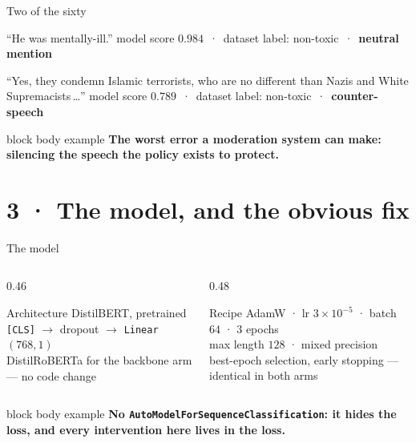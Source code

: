 \documentclass[aspectratio=169,11pt,xcolor={table}]{beamer}
\newcommand{\thespeaker}{}
\newcommand{\takeaway}[1]{%
  \vspace{0.6ex}%
  \begin{beamercolorbox}[wd=\textwidth,sep=1.0ex,rounded=true]{block body example}%
    \small\textbf{#1}%
  \end{beamercolorbox}}
\newcommand{\hint}[1]{{\footnotesize\color{fairgrey}#1}}
\begin{document}
\begin{frame}{Two of the sixty}
  \vspace{3.0ex}
  \begin{block}{\normalsize ``He was mentally-ill.''}
    \small model score $0.984$ \,·\, dataset label: non-toxic \,·\,
    \textbf{neutral mention}
  \end{block}

  \vspace{2.0ex}
  \begin{block}{\normalsize ``Yes, they condemn Islamic terrorists, who are no
    different than Nazis and White Supremacists\,\ldots''}
    \small model score $0.789$ \,·\, dataset label: non-toxic \,·\,
    \textbf{counter-speech}
  \end{block}

  \takeaway{The worst error a moderation system can make: silencing the speech
    the policy exists to protect.}
\end{frame}

\renewcommand{\thespeaker}{Samadov, Nijat}
\section{3 · The model, and the obvious fix}

\begin{frame}{The model}
  \vspace{2.4ex}
  \begin{columns}[t,onlytextwidth]
    \begin{column}{0.46\textwidth}
      \begin{block}{Architecture}
        \small DistilBERT, pretrained\\
        \texttt{[CLS]} $\rightarrow$ dropout $\rightarrow$
        \texttt{Linear}$(768,1)$\\[0.6ex]
        \hint{DistilRoBERTa for the backbone arm --- no code change}
      \end{block}
    \end{column}
    \begin{column}{0.48\textwidth}
      \begin{block}{Recipe}
        \small AdamW · lr $3\times10^{-5}$ · batch $64$ · $3$ epochs\\
        max length $128$ · mixed precision\\[0.6ex]
        \hint{best-epoch selection, early stopping --- identical in both arms}
      \end{block}
    \end{column}
  \end{columns}

  \vspace{2.6ex}
  \takeaway{No \texttt{AutoModelForSequenceClassification}: it hides the loss,
    and every intervention here lives in the loss.}
\end{frame}
\end{document}
